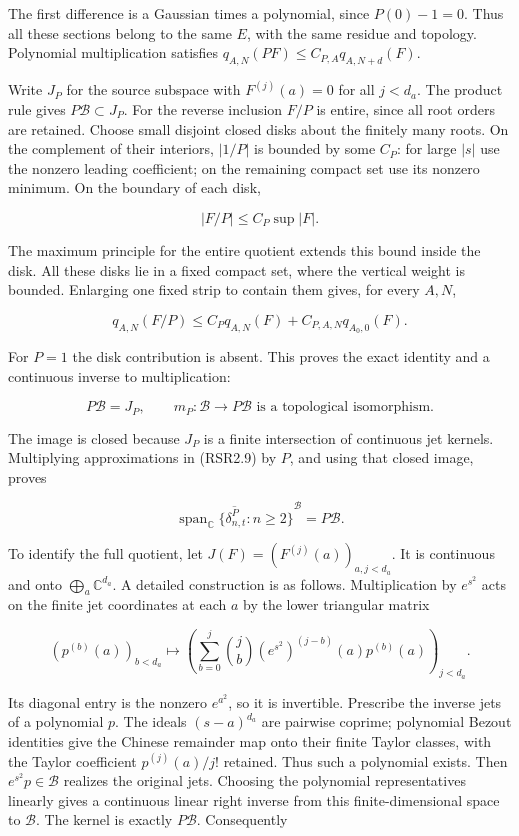 The first difference is a Gaussian times a polynomial, since
\(P(0)-1=0\). Thus all these sections belong to the same \(E\), with the
same residue and topology. Polynomial multiplication satisfies
\(q_{A,N}(PF)\le C_{P,A}q_{A,N+d}(F)\).

Write \(J_P\) for the source subspace with \(F^{(j)}(a)=0\) for all
\(j<d_a\). The product rule gives \(P\mathcal B\subset J_P\). For the
reverse inclusion \(F/P\) is entire, since all root orders are retained.
Choose small disjoint closed disks about the finitely many roots. On the
complement of their interiors, \(|1/P|\) is bounded by some \(C_P\): for
large \(|s|\) use the nonzero leading coefficient; on the remaining
compact set use its nonzero minimum. On the boundary of each disk,

\[
|F/P|\le C_P\sup|F|.
\]

The maximum principle for the entire quotient extends this bound inside
the disk. All these disks lie in a fixed compact set, where the vertical
weight is bounded. Enlarging one fixed strip to contain them gives, for
every \(A,N\),

\[
q_{A,N}(F/P)\le C_Pq_{A,N}(F)
+C_{P,A,N}q_{A_0,0}(F).
\tag{RSR3.2}
\]

For \(P=1\) the disk contribution is absent. This proves the exact
identity and a continuous inverse to multiplication:

\[
\boxed{P\mathcal B=J_P,\qquad
m_P:\mathcal B\longrightarrow P\mathcal B
\text{ is a topological isomorphism}.}
\tag{RSR3.3}
\]

The image is closed because \(J_P\) is a finite intersection of
continuous jet kernels. Multiplying approximations in (RSR2.9) by \(P\),
and using that closed image, proves

\[
\boxed{\overline{\operatorname{span}_{\mathbb C}\{\delta^P_{n,t}:n\ge2\}}^{\mathcal B}=P\mathcal B.}
\tag{RSR3.4}
\]

To identify the full quotient, let \(J(F)=(F^{(j)}(a))_{a,j<d_a}\). It
is continuous and onto \(\bigoplus_a\mathbb C^{d_a}\). A detailed
construction is as follows. Multiplication by \(e^{s^2}\) acts on the
finite jet coordinates at each \(a\) by the lower triangular matrix

\[
(p^{(b)}(a))_{b<d_a}\longmapsto
\left(\sum_{b=0}^j\binom jb(e^{s^2})^{(j-b)}(a)p^{(b)}(a)\right)_{j<d_a}.
\tag{RSR3.5}
\]

Its diagonal entry is the nonzero \(e^{a^2}\), so it is invertible.
Prescribe the inverse jets of a polynomial \(p\). The ideals
\((s-a)^{d_a}\) are pairwise coprime; polynomial Bezout identities give
the Chinese remainder map onto their finite Taylor classes, with the
Taylor coefficient \(p^{(j)}(a)/j!\) retained. Thus such a polynomial
exists. Then \(e^{s^2}p\in\mathcal B\) realizes the original jets.
Choosing the polynomial representatives linearly gives a continuous
linear right inverse from this finite-dimensional space to
\(\mathcal B\). The kernel is exactly \(P\mathcal B\). Consequently

